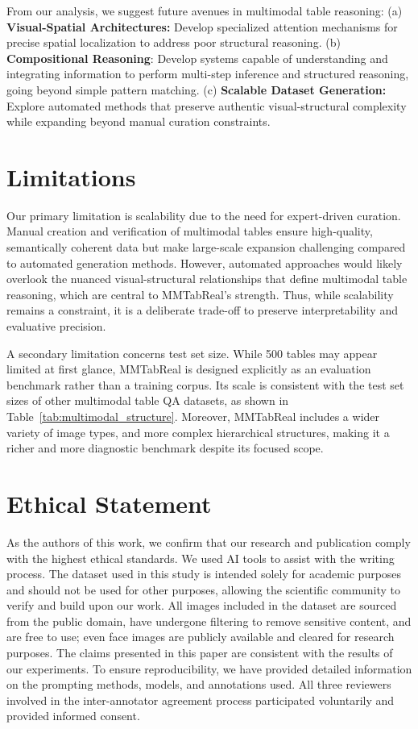 \documentclass[11pt]{article}
\newcommand{\datasetName}{{\sc MMTabReal}\xspace}
\begin{document}
From our analysis, we suggest future avenues in multimodal table reasoning: (a) \textbf{Visual-Spatial Architectures:} Develop specialized attention mechanisms for precise spatial localization to address poor structural reasoning. (b) \textbf{Compositional Reasoning}: Develop systems capable of understanding and integrating information to perform multi-step inference and structured reasoning, going beyond simple pattern matching. (c) \textbf{Scalable Dataset Generation:} Explore automated methods that preserve authentic visual-structural complexity while expanding beyond manual curation constraints.


\section*{Limitations}
Our primary limitation is scalability due to the need for expert-driven curation. Manual creation and verification of multimodal tables ensure high-quality, semantically coherent data but make large-scale expansion challenging compared to automated generation methods. However, automated approaches would likely overlook the nuanced visual-structural relationships that define multimodal table reasoning, which are central to \datasetName’s strength. Thus, while scalability remains a constraint, it is a deliberate trade-off to preserve interpretability and evaluative precision.

A secondary limitation concerns test set size. While 500 tables may appear limited at first glance, \datasetName is designed explicitly as an evaluation benchmark rather than a training corpus. Its scale is consistent with the test set sizes of other multimodal table QA datasets, as shown in Table~\ref{tab:multimodal_structure}. Moreover, \datasetName includes a wider variety of image types, and more complex hierarchical structures, making it a richer and more diagnostic benchmark despite its focused scope.

\section*{Ethical Statement}
As the authors of this work, we confirm that our research and publication comply with the highest ethical standards. We used AI tools to assist with the writing process. The dataset used in this study is intended solely for academic purposes and should not be used for other purposes, allowing the scientific community to verify and build upon our work. All images included in the dataset are sourced from the public domain, have undergone filtering to remove sensitive content, and are free to use; even face images are publicly available and cleared for research purposes. The claims presented in this paper are consistent with the results of our experiments. To ensure reproducibility, we have provided detailed information on the prompting methods, models, and annotations used. All three reviewers involved in the inter-annotator agreement process participated voluntarily and provided informed consent.
\end{document}
